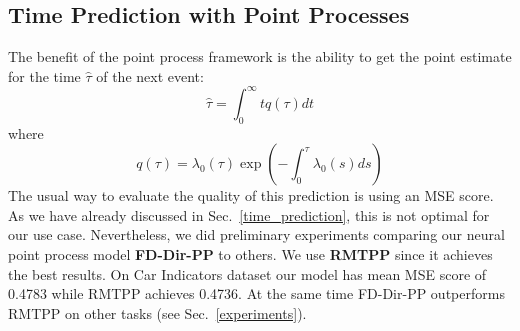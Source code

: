 \subsection{Time Prediction with Point Processes}\label{time_mse}

The benefit of the point process framework is the ability to get the point estimate for the time $\hat{\tau}$ of the next event:
\begin{equation}
    \hat{\tau} = \int_0^\infty t q(\tau) dt
\end{equation}
where
\begin{equation}
q(\tau) = \lambda_0(\tau) \exp\left( -\int_0^{\tau} \lambda_0(s) ds \right)
\end{equation}
The usual way to evaluate the quality of this prediction is using an MSE score. As we have already discussed in Sec.\ \ref{time_prediction}, this is not optimal for our use case. Nevertheless, we did preliminary experiments comparing our neural point process model \textbf{FD-Dir-PP} to others. We use \textbf{RMTPP} \cite{RMTPP} since it achieves the best results. On Car Indicators dataset our model has mean MSE score of 0.4783 while RMTPP achieves 0.4736. At the same time FD-Dir-PP outperforms RMTPP on other tasks (see Sec.\ \ref{experiments}).
